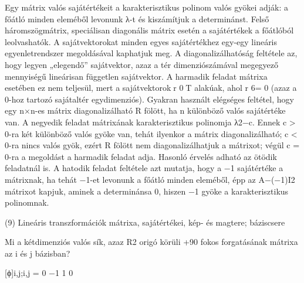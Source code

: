 \begin{frame}
  \begin{tcolorbox}[title={8/6. -Q-}]
     Egy mátrix valós sajátértékeit a karakterisztikus polinom valós gyökei adják: a főátló minden eleméből levonunk λ-t és kiszámítjuk a determinánst. Felső háromszögmátrix, speciálisan diagonális mátrix esetén a sajátértékek a főátlóból leolvashatók. A sajátvektorokat minden egyes sajátértékhez egy-egy lineáris egyenletrendszer megoldásával kaphatjuk meg. A diagonalizálhatóság feltétele az, hogy legyen „elegendő” sajátvektor, azaz a tér dimenziószámával megegyező mennyiségű lineárisan független sajátvektor. A harmadik feladat mátrixa esetében ez nem teljesül, mert a sajátvektorokr 0T alakúak, ahol r 6= 0 (azaz a 0-hoz tartozó sajátaltér egydimenziós). Gyakran használt elégséges feltétel, hogy egy n×n-es mátrix diagonalizálható R fölött, ha n különböző valós sajátértéke van. A negyedik feladat mátrixának karakterisztikus polinomja λ2−c. Ennek c > 0-ra két különböző valós gyöke van, tehát ilyenkor a mátrix diagonalizálható; c < 0-ra nincs valós gyök, ezért R fölött nem diagonalizálhatjuk a mátrixot; végül c = 0-ra a megoldást a harmadik feladat adja. Hasonló érvelés adható az ötödik feladatnál is. A hatodik feladat feltétele azt mutatja, hogy a −1 sajátértéke a mátrixnak, ha tehát −1-et levonunk a főátló minden eleméből, épp az A−(−1)I2 mátrixot kapjuk, aminek a determinánsa 0, hiszen −1 gyöke a karakterisztikus polinomnak.

  \end{tcolorbox}
\end{frame}



\begin{frame}[plain]
\begin{tcolorbox}[center, colback={myyellow}, coltext={black}, colframe={myyellow}]
    {\RHuge  (9) Lineáris transzformációk mátrixa, sajátértékei, kép- és magtere; báziscsere }
    \mmedskip
\end{tcolorbox}
\end{frame}

\begin{frame}
  \begin{tcolorbox}[title={9/1. -N-}]
    Mi a kétdimenziós valós sík, azaz R2 origó körüli +90 fokos forgatásának mátrixa az i és j bázisban?

  \tcblower

    \mmedskip 
    
    [ϕ]i,j;i,j = 0 −1 1 0
  \end{tcolorbox}
\end{frame}


